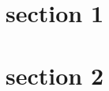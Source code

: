 \documentclass[11pt]{article}
\begin{document}
\section{section 1}
\lipsum[1]
\section{section 2}
\lipsum[2]
\end{document}
